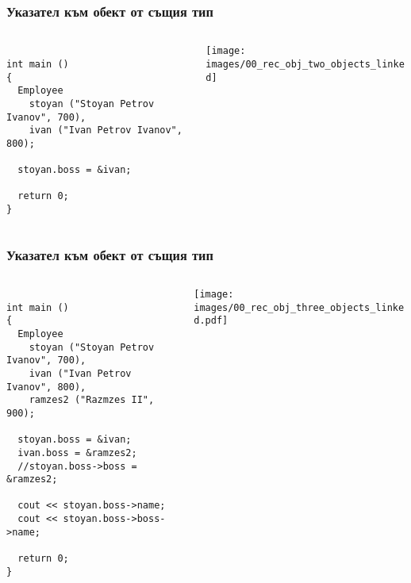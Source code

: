 \documentclass{beamer}
\begin{document}
\begin{frame}[fragile]
\frametitle{Указател към обект от същия тип}

\begin{columns}[c]
  \begin{column}{0.55\textwidth}
\begin{flushleft}
\begin{lstlisting}

int main ()
{
  Employee 
    stoyan ("Stoyan Petrov Ivanov", 700),
    ivan ("Ivan Petrov Ivanov", 800);

  stoyan.boss = &ivan;

  return 0;
}

\end{lstlisting}  
\end{flushleft}

  \end{column}
  \begin{column}{0.45\textwidth}
\hspace{-100px}
\texttt{[image: images/00\_rec\_obj\_two\_objects\_linked]}

  \end{column}
\end{columns}
\end{frame}




\begin{frame}[fragile]
\frametitle{Указател към обект от същия тип}

\begin{columns}[c]
  \begin{column}{0.55\textwidth}
\begin{flushleft}
\begin{lstlisting}

int main ()
{
  Employee 
    stoyan ("Stoyan Petrov Ivanov", 700),
    ivan ("Ivan Petrov Ivanov", 800),
    ramzes2 ("Razmzes II", 900);

  stoyan.boss = &ivan;
  ivan.boss = &ramzes2;
  //stoyan.boss->boss = &ramzes2;
  
  cout << stoyan.boss->name;
  cout << stoyan.boss->boss->name;

  return 0;
}

\end{lstlisting}  
\end{flushleft}

  \end{column}
  \begin{column}{0.45\textwidth}
\hspace{-150px}
\texttt{[image: images/00\_rec\_obj\_three\_objects\_linked.pdf]}

  \end{column}
\end{columns}
\end{frame}
\end{document}
